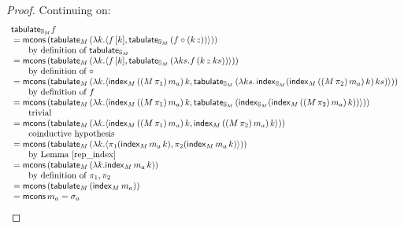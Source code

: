 \documentclass{article}
\begin{document}
\begin{proof}
Continuing on:
$$
\begin{array}{l}
\mathsf{tabulate}_{\mathbb{S}_{M}} f \\
{}= \mathsf{mcons}\,(\mathsf{tabulate}_M\, (\lambda k. \langle f\, [k], \mathsf{tabulate}_{\mathbb{S}_{M}}\,(f \circ (k\, \mathbin{:\hspace{-0.1em}:})) \rangle))\\
\qquad \mbox{by definition of }\mathsf{tabulate}_{\mathbb{S}_{M}} \\
{}= \mathsf{mcons}\,(\mathsf{tabulate}_M\, (\lambda k. \langle f\, [k], \mathsf{tabulate}_{\mathbb{S}_{M}}\,(\lambda ks . f\, (k \mathbin{:\hspace{-0.1em}:} ks)) \rangle))\\
\qquad \mbox{by definition of }\circ \\
{}= \mathsf{mcons}\,(\mathsf{tabulate}_M\, (\lambda k. \langle \mathsf{index}_M\, ((M\,\pi_1)\,m_a)\, k, \mathsf{tabulate}_{\mathbb{S}_{M}}\,(\lambda ks.\, \mathsf{index}_{\mathbb{S}_{M}} (\mathsf{index}_M\, ((M\,\pi_2)\,m_a)\, k)\, ks) \rangle))\\
\qquad \mbox{by definition of }f \\
{}= \mathsf{mcons}\,(\mathsf{tabulate}_M\, (\lambda k. \langle \mathsf{index}_M\, ((M\,\pi_1)\,m_a)\, k, \mathsf{tabulate}_{\mathbb{S}_{M}}\,(\mathsf{index}_{\mathbb{S}_{M}} (\mathsf{index}_M\, ((M\,\pi_2)\,m_a)\, k)) \rangle)) \\
\qquad \mbox{trivial} \\
{}= \mathsf{mcons}\,(\mathsf{tabulate}_M\, (\lambda k. \langle \mathsf{index}_M\, ((M\,\pi_1)\,m_a)\, k, \mathsf{index}_M\, ((M\,\pi_2)\,m_a)\, k \rangle))\\
\qquad \mbox{coinductive hypothesis} \\
{}= \mathsf{mcons}\,(\mathsf{tabulate}_M\, (\lambda k. \langle \pi_1 (\mathsf{index}_M \,m_a\, k), \pi_2 (\mathsf{index}_M \,m_a\, k) \rangle))\\
\qquad \mbox{by Lemma \ref{rep_index}}
\\
{}= \mathsf{mcons}\,(\mathsf{tabulate}_M\, (\lambda k. \mathsf{index}_M \,m_a\, k))\\
\qquad \mbox{by definition of }\pi_1, \pi_2 \\
{}= \mathsf{mcons}\,(\mathsf{tabulate}_M\, (\mathsf{index}_M \,m_a))\\
{}= \mathsf{mcons}\,m_a = \sigma_a
\end{array}
$$
\end{proof}
\end{document}
